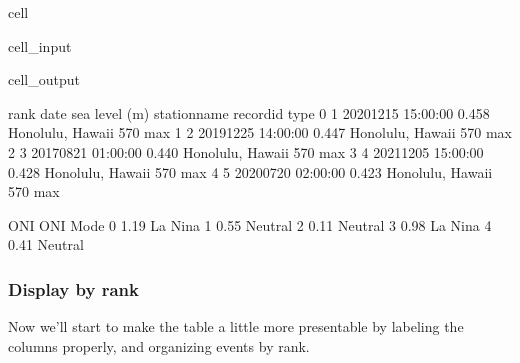 \documentclass[letterpaper,10pt,english]{jupyterBook}
\begin{document}
\begin{sphinxuseclass}{cell}\begin{sphinxVerbatimInput}

\begin{sphinxuseclass}{cell_input}
\begin{sphinxVerbatim}[commandchars=\\\{\}]
  
\end{sphinxVerbatim}

\end{sphinxuseclass}\end{sphinxVerbatimInput}
\begin{sphinxVerbatimOutput}

\begin{sphinxuseclass}{cell_output}
\begin{sphinxVerbatim}[commandchars=\\\{\}]
   rank                date  sea level (m)      station\PYGZus{}name record\PYGZus{}id type  \PYGZbs{}
0     1 2020\PYGZhy{}12\PYGZhy{}15 15:00:00          0.458  Honolulu, Hawaii       570  max   
1     2 2019\PYGZhy{}12\PYGZhy{}25 14:00:00          0.447  Honolulu, Hawaii       570  max   
2     3 2017\PYGZhy{}08\PYGZhy{}21 01:00:00          0.440  Honolulu, Hawaii       570  max   
3     4 2021\PYGZhy{}12\PYGZhy{}05 15:00:00          0.428  Honolulu, Hawaii       570  max   
4     5 2020\PYGZhy{}07\PYGZhy{}20 02:00:00          0.423  Honolulu, Hawaii       570  max   

    ONI ONI Mode  
0 \PYGZhy{}1.19  La Nina  
1  0.55  Neutral  
2 \PYGZhy{}0.11  Neutral  
3 \PYGZhy{}0.98  La Nina  
4 \PYGZhy{}0.41  Neutral  
\end{sphinxVerbatim}

\end{sphinxuseclass}\end{sphinxVerbatimOutput}

\end{sphinxuseclass}

\subsubsection{Display by rank}
\label{\detokenize{notebooks/regional_and_local/SL_Rankings_annual:display-by-rank}}
\sphinxAtStartPar
Now we’ll start to make the table a little more presentable by labeling the columns properly, and organizing events by rank.
\end{document}

